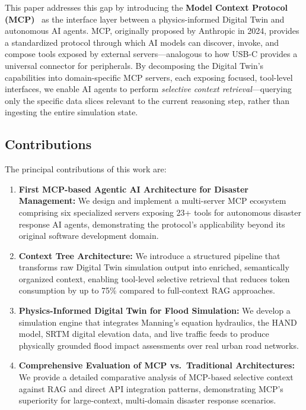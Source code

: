 \documentclass[journal]{IEEEtran}
\begin{document}
This paper addresses this gap by introducing the \textbf{Model Context
Protocol (MCP)}~\cite{anthropic2024mcp} as the interface layer between a
physics-informed Digital Twin and autonomous AI agents. MCP, originally
proposed by Anthropic in 2024, provides a standardized protocol through which
AI models can discover, invoke, and compose tools exposed by external
servers---analogous to how USB-C provides a universal connector for
peripherals. By decomposing the Digital Twin's capabilities into domain-specific
MCP servers, each exposing focused, tool-level interfaces, we enable AI agents
to perform \emph{selective context retrieval}---querying only the specific
data slices relevant to the current reasoning step, rather than ingesting the
entire simulation state.

\subsection{Contributions}
The principal contributions of this work are:

\begin{enumerate}[leftmargin=*]
    \item \textbf{First MCP-based Agentic AI Architecture for Disaster
    Management:} We design and implement a multi-server MCP ecosystem
    comprising six specialized servers exposing 23+ tools for autonomous
    disaster response AI agents, demonstrating the protocol's applicability
    beyond its original software development domain.

    \item \textbf{Context Tree Architecture:} We introduce a structured
    pipeline that transforms raw Digital Twin simulation output into enriched,
    semantically organized context, enabling tool-level selective retrieval
    that reduces token consumption by up to 75\% compared to full-context
    RAG approaches.

    \item \textbf{Physics-Informed Digital Twin for Flood Simulation:} We
    develop a simulation engine that integrates Manning's equation hydraulics,
    the HAND model, SRTM digital elevation data, and live traffic feeds to
    produce physically grounded flood impact assessments over real urban road
    networks.

    \item \textbf{Comprehensive Evaluation of MCP vs.\ Traditional
    Architectures:} We provide a detailed comparative analysis of MCP-based
    selective context against RAG and direct API integration patterns,
    demonstrating MCP's superiority for large-context, multi-domain disaster
    response scenarios.
\end{enumerate}
\end{document}

